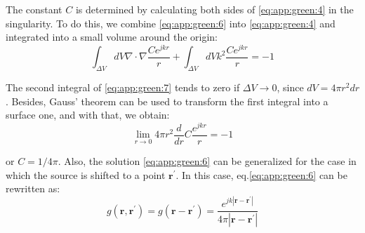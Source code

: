 			The constant $C$ is determined by calculating both sides of \eqref{eq:app:green:4} in the singularity. To do this, we combine \eqref{eq:app:green:6} into \eqref{eq:app:green:4} and integrated into a small volume around the origin:
			\begin{equation}
				\int_{\Delta V} dV \nabla\cdot\nabla\frac{Ce^{jkr}}{r} + \int_{\Delta V} dVk^2\frac{Ce^{jkr}}{r} = -1 \label{eq:app:green:7}
			\end{equation}
   
   			The second integral of \eqref{eq:app:green:7} tends to zero if $\Delta V \rightarrow 0$, since $dV = 4\pi r^2dr$. Besides, Gauss' theorem can be used to transform the first integral into a surface one, and with that, we obtain:
   			\begin{equation}
   				\lim\limits_{r\rightarrow0} 4\pi r^2\frac{d}{dr}C\frac{e^{jkr}}{r} = -1 \label{eq:app:green:8}
   			\end{equation} 

			\noindent or $C=1/4\pi$. Also, the solution \eqref{eq:app:green:6} can be generalized for the case in which the source is shifted to a point $\mathbf{r^\prime}$. In this case, eq.\eqref{eq:app:green:6} can be rewritten as:
			\begin{equation}
				g(\mathbf{r},\mathbf{r^\prime}) = g(\mathbf{r}-\mathbf{r^\prime}) = \frac{e^{jk|\mathbf{r}-\mathbf{r^\prime}|}}{4\pi |\mathbf{r}-\mathbf{r^\prime}|} \label{eq:app:green:9}
			\end{equation}
	
